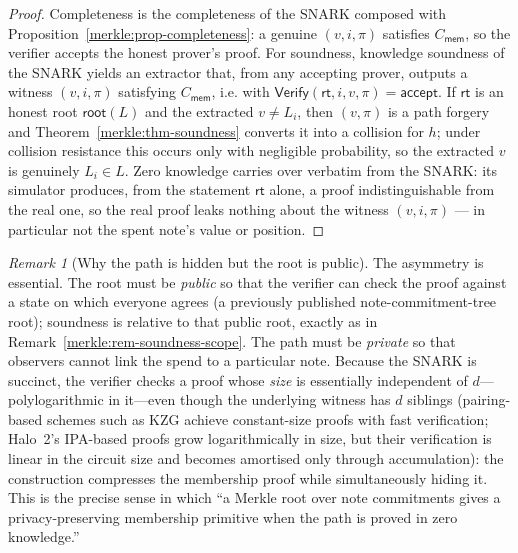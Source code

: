 \documentclass[11pt,a4paper]{article}
\theoremstyle{definition}
\theoremstyle{remark}
\newtheorem{remark}[theorem]{Remark}
\begin{document}
\begin{proof}
Completeness is the completeness of the SNARK composed with Proposition~\ref{merkle:prop-completeness}: a genuine \((v,i,\pi)\) satisfies \(C_{\mathsf{mem}}\), so the verifier accepts the honest prover's proof. For soundness, knowledge soundness of the SNARK yields an extractor that, from any accepting prover, outputs a witness \((v,i,\pi)\) satisfying \(C_{\mathsf{mem}}\), i.e. with \(\mathsf{Verify}(\mathsf{rt},i,v,\pi) = \mathsf{accept}\). If \(\mathsf{rt}\) is an honest root \(\mathsf{root}(L)\) and the extracted \(v \neq L_i\), then \((v,\pi)\) is a path forgery and Theorem~\ref{merkle:thm-soundness} converts it into a collision for \(h\); under collision resistance this occurs only with negligible probability, so the extracted \(v\) is genuinely \(L_i \in L\). Zero knowledge carries over verbatim from the SNARK: its simulator produces, from the statement \(\mathsf{rt}\) alone, a proof indistinguishable from the real one, so the real proof leaks nothing about the witness \((v,i,\pi)\) --- in particular not the spent note's value or position.
\end{proof}

\begin{remark}[Why the path is hidden but the root is public]\label{merkle:rem-zk-design}
The asymmetry is essential. The root must be \emph{public} so that the verifier can check the proof against a state on which everyone agrees (a previously published note-commitment-tree root); soundness is relative to that public root, exactly as in Remark~\ref{merkle:rem-soundness-scope}. The path must be \emph{private} so that observers cannot link the spend to a particular note. Because the SNARK is succinct, the verifier checks a proof whose \emph{size} is essentially independent of \(d\)---polylogarithmic in it---even though the underlying witness has \(d\) siblings (pairing-based schemes such as KZG achieve constant-size proofs with fast verification; Halo~2's IPA-based proofs grow logarithmically in size, but their verification is linear in the circuit size and becomes amortised only through accumulation): the construction compresses the membership proof while simultaneously hiding it. This is the precise sense in which ``a Merkle root over note commitments gives a privacy-preserving membership primitive when the path is proved in zero knowledge.''
\end{remark}
\end{document}
